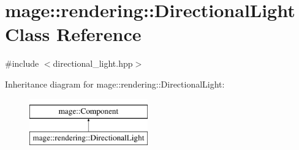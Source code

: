 \hypertarget{classmage_1_1rendering_1_1_directional_light}{}\section{mage\+:\+:rendering\+:\+:Directional\+Light Class Reference}
\label{classmage_1_1rendering_1_1_directional_light}


{\ttfamily \#include $<$directional\+\_\+light.\+hpp$>$}

Inheritance diagram for mage\+:\+:rendering\+:\+:Directional\+Light\+:\begin{figure}[H]
\begin{center}
\leavevmode
\includegraphics[height=2.000000cm]{classmage_1_1rendering_1_1_directional_light}
\end{center}
\end{figure}
